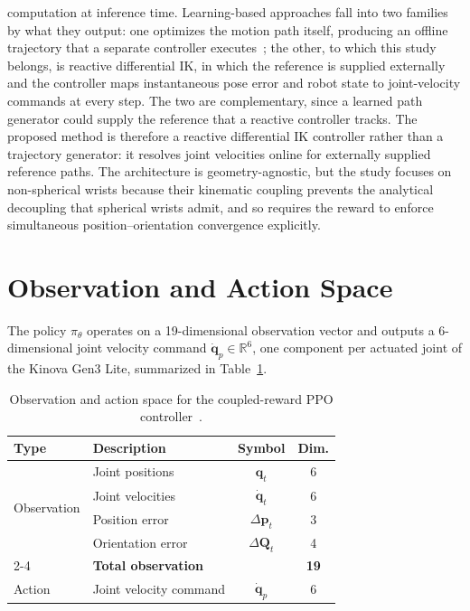 computation at inference time. Learning-based approaches fall into two families by what they
output: one optimizes the motion path itself, producing an offline trajectory that a separate
controller executes~\citep{ota2019trajectory,li2021general,khan2025reinforcement}; the other, to which
this study belongs, is reactive differential IK, in which the reference is supplied externally and the
controller maps instantaneous pose error and robot state to joint-velocity commands at every step. The
two are complementary, since a learned path generator could supply the reference that a reactive
controller tracks. The proposed method is therefore a reactive differential IK controller rather
than a trajectory generator: it resolves joint velocities online for externally supplied reference
paths. The architecture is geometry-agnostic, but the study focuses on non-spherical wrists because
their kinematic coupling prevents the analytical decoupling that spherical wrists admit, and so
requires the reward to enforce simultaneous position--orientation convergence explicitly.

\section{Observation and Action Space}\label{sec:dikppo_observation}

The policy $\pi_\theta$ operates on a 19-dimensional observation vector and outputs a
6-dimensional joint velocity command $\dot{\mathbf{q}}_p \in \mathbb{R}^6$, one component
per actuated joint of the Kinova Gen3 Lite, summarized in Table~\ref{tab:dikppo_obsspace}.

\begin{table}[htbp]
\centering
\caption{Observation and action space for the coupled-reward PPO controller~\citep{sk2025diktracking}.}
\label{tab:dikppo_obsspace}
\begin{tabular}{llcc}
\toprule
\textbf{Type} & \textbf{Description} & \textbf{Symbol} & \textbf{Dim.} \\
\midrule
\multirow{4}{*}{Observation} & Joint positions  & $\mathbf{q}_t$ & 6 \\
                              & Joint velocities & $\dot{\mathbf{q}}_t$ & 6 \\
                              & Position error   & $\Delta \mathbf{p}_t$ & 3 \\
                              & Orientation error & $\Delta \mathbf{Q}_t$ & 4 \\
\cmidrule(l){2-4}
                              & \textbf{Total observation} & & \textbf{19} \\
\midrule
Action & Joint velocity command & $\dot{\mathbf{q}}_p$ & 6 \\
\bottomrule
\end{tabular}
\end{table}

